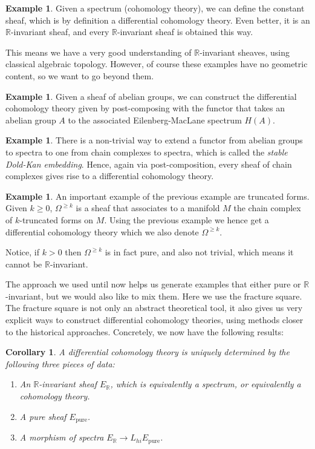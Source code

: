 \documentclass[10pt]{amsart}
\newcommand{\bR}{\mathbb{R}}
\newtheorem{corollary}[equation]{Corollary}
\theoremstyle{definition}
\newtheorem{example}[equation]{Example}
\theoremstyle{remark}
\numberwithin{equation}{section}
\begin{document}
\begin{example}
  Given a spectrum (cohomology theory), we can define the constant sheaf, which is by definition a differential cohomology theory. Even better, it is an $\bR$-invariant sheaf, and every $\bR$-invariant sheaf is obtained this way.
\end{example}

This means we have a very good understanding of $\bR$-invariant sheaves, using classical algebraic topology. However, of course these examples have no geometric content, so we want to go beyond them.

\begin{example}
  Given a sheaf of abelian groups, we can construct the differential cohomology theory given by post-composing with the functor that takes an abelian group $A$ to the associated Eilenberg-MacLane spectrum $H(A)$. 
\end{example}

\begin{example}
  There is a non-trivial way to extend a functor from abelian groups to spectra to one from chain complexes to spectra, which is called the \emph{stable Dold-Kan embedding}. Hence, again via post-composition, every sheaf of chain complexes gives rise to a differential cohomology theory.
\end{example}

\begin{example}
 An important example of the previous example are truncated forms. Given $k \geq 0$, $\Omega^{\geq k}$ is a sheaf that associates to a manifold $M$ the chain complex of $k$-truncated forms on $M$. Using the previous example we hence get a differential cohomology theory which we also denote $\Omega^{\geq k }$.

 Notice, if $k > 0$ then $\Omega^{\geq k}$ is in fact pure, and also not trivial, which means it cannot be $\bR$-invariant.
\end{example}

The approach we used until now helps us generate examples that either pure or $\bR$-invariant, but we would also like to mix them. Here we use the fracture square. The fracture square is not only an abstract theoretical tool, it also gives us very explicit ways to construct differential cohomology theories, using methods closer to the historical approaches. Concretely, we now have the following results:

\begin{corollary}
  A differential cohomology theory is uniquely determined by the following three pieces of data:
  \begin{enumerate}
    \item An $\bR$-invariant sheaf $E_{\bR}$, which is equivalently a spectrum, or equivalently a cohomology theory.
    \item A pure sheaf $E_{\mathrm{pure}}$. 
    \item A morphism of spectra $E_{\bR} \to L_{hi}E_{\mathrm{pure}}$.
  \end{enumerate}
\end{corollary}
\end{document}
